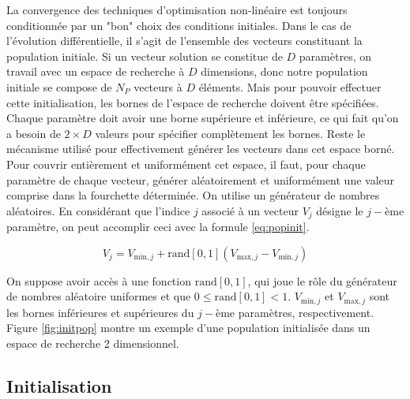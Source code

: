 La convergence des techniques d'optimisation non-linéaire est toujours conditionnée par un "bon" choix des conditions initiales. Dans le cas de l'évolution différentielle, il s'agit de l'ensemble des vecteurs constituant la population initiale. Si un vecteur solution se constitue de $D$ paramètres, on travail avec un espace de recherche à $D$ dimensions, donc notre population initiale se compose de $N_P$ vecteurs à $D$ éléments. Mais pour pouvoir effectuer cette initialisation, les bornes de l'espace de recherche doivent être spécifiées. Chaque paramètre doit avoir une borne supérieure et inférieure, ce qui fait qu'on a besoin de $2 \times D$ valeurs pour spécifier complètement les bornes. Reste le mécanisme utilisé pour effectivement générer les vecteurs dans cet espace borné. Pour couvrir entièrement et uniformément cet espace, il faut, pour chaque paramètre de chaque vecteur, générer aléatoirement et uniformément une valeur comprise dans la fourchette déterminée. On utilise un générateur de nombres aléatoires. En considérant que l'indice $j$ associé à un vecteur $V_j$ désigne le $j-$ème paramètre, on peut accomplir ceci avec la formule \ref{eq:popinit}. 

\begin{equation}
  \label{eq:popinit}
  V_j = V_{\text{min},j} + \text{rand}[0, 1](V_{\text{max},j} - V_{\text{min},j})
\end{equation} 

On suppose avoir accès à une fonction $\text{rand}[0, 1]$, qui joue le rôle du générateur de nombres aléatoire uniformes et que $0 \leq \text{rand}[0, 1] < 1$. 
$V_{\text{min},j}$ et $V_{\text{max},j}$ sont les bornes inférieures   et supérieures du $j-$ème paramètres, respectivement. Figure \ref{fig:initpop} montre un exemple d'une population initialisée dans un espace de recherche 2 dimensionnel.

\subsection{Initialisation}



 
